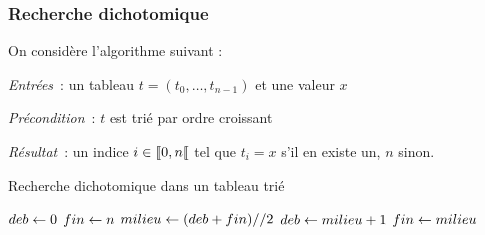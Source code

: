 \documentclass{magnolia}
\begin{document}
\subsubsection{Recherche dichotomique}

  On considère l'algorithme suivant :
  \begin{description}
    \item \emph{Entrées}~: un tableau $t = (t_{0}, \dots, t_{n - 1})$ et une valeur $x$
    \item \emph{Précondition}~: $t$ est trié par ordre croissant
    \item \emph{Résultat}~: un indice $i \in\left\llbracket 0,n\right\llbracket$ tel que $t_{i} = x$ s'il
          en existe un, $n$ sinon.
  \end{description}
  \begin{algorithm}[H]
    \caption{Recherche dichotomique dans un tableau trié}
  \begin{algorithmic}
        \State $deb \leftarrow 0$
        \State $fin \leftarrow n$
          \State $milieu \leftarrow (deb + fin) // 2$ 
            \State {}
            \State $deb \leftarrow milieu + 1$
          \Else
            \State $fin \leftarrow milieu$
          \EndIf
        \EndWhile
        \State {}
      \EndFunction
    \end{algorithmic}
    \end{algorithm}
\end{document}
